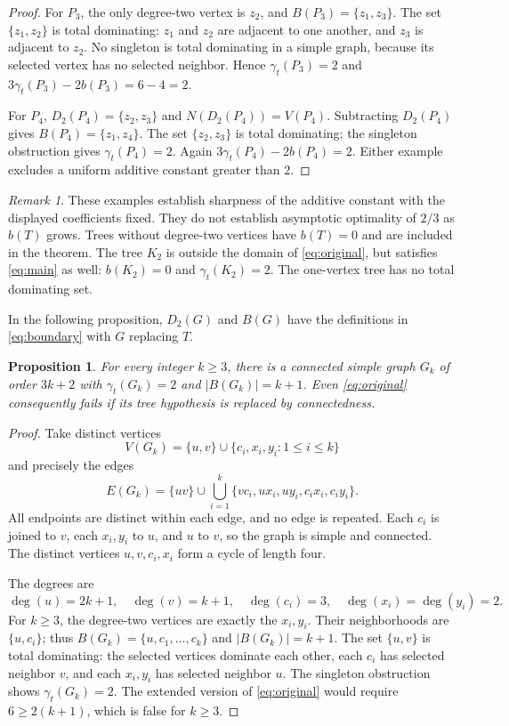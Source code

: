 \documentclass[11pt,a4paper]{article}
\newtheorem{proposition}[theorem]{Proposition}
\theoremstyle{remark}
\newtheorem{remark}[theorem]{Remark}
\newcommand{\td}{\gamma_t}
\newcommand{\BB}{B}
\begin{document}
\begin{proof}
For $P_3$, the only degree-two vertex is $z_2$, and
$\BB(P_3)=\{z_1,z_3\}$. The set $\{z_1,z_2\}$ is total dominating:
$z_1$ and $z_2$ are adjacent to one another, and $z_3$ is adjacent
to $z_2$. No singleton is total dominating in a simple graph,
because its selected vertex has no selected neighbor. Hence
$\td(P_3)=2$ and $3\td(P_3)-2b(P_3)=6-4=2$.

For $P_4$, $D_2(P_4)=\{z_2,z_3\}$ and $N(D_2(P_4))=V(P_4)$.
Subtracting $D_2(P_4)$ gives $\BB(P_4)=\{z_1,z_4\}$.
The set $\{z_2,z_3\}$ is total dominating; the singleton obstruction
gives $\td(P_4)=2$. Again $3\td(P_4)-2b(P_4)=2$.
Either example excludes a uniform additive constant greater than $2$.
\end{proof}

\begin{remark}
These examples establish sharpness of the additive constant with
the displayed coefficients fixed. They do not establish asymptotic
optimality of $2/3$ as $b(T)$ grows. Trees without degree-two vertices
have $b(T)=0$ and are included in the theorem. The tree $K_2$ is
outside the domain of \eqref{eq:original}, but satisfies
\eqref{eq:main} as well: $b(K_2)=0$ and $\td(K_2)=2$.
The one-vertex tree has no total dominating set.
\end{remark}

In the following proposition, $D_2(G)$ and $\BB(G)$ have the
definitions in \eqref{eq:boundary} with $G$ replacing $T$.

\begin{proposition}\label{prop:cycles}
For every integer $k\ge 3$, there is a connected simple graph $G_k$
of order $3k+2$ with $\td(G_k)=2$ and $|\BB(G_k)|=k+1$.
Even \eqref{eq:original} consequently fails if its tree hypothesis
is replaced by connectedness.
\end{proposition}

\begin{proof}
Take distinct vertices
\[
 V(G_k)=\{u,v\}\cup\{c_i,x_i,y_i:1\le i\le k\}
\]
and precisely the edges
\[
 E(G_k)=\{uv\}\cup
 \bigcup_{i=1}^{k}\{vc_i,ux_i,uy_i,c_ix_i,c_iy_i\}.
\]
All endpoints are distinct within each edge, and no edge is repeated.
Each $c_i$ is joined to $v$, each $x_i,y_i$ to $u$, and $u$ to $v$,
so the graph is simple and connected. The distinct vertices
$u,v,c_i,x_i$ form a cycle of length four.

The degrees are
\[
 \deg(u)=2k+1,\quad \deg(v)=k+1,\quad
 \deg(c_i)=3,\quad \deg(x_i)=\deg(y_i)=2.
\]
For $k\ge 3$, the degree-two vertices are exactly the $x_i,y_i$.
Their neighborhoods are $\{u,c_i\}$; thus
$\BB(G_k)=\{u,c_1,\ldots,c_k\}$ and $|\BB(G_k)|=k+1$.
The set $\{u,v\}$ is total dominating: the selected vertices
dominate each other, each $c_i$ has selected neighbor $v$, and
each $x_i,y_i$ has selected neighbor $u$. The singleton obstruction
shows $\td(G_k)=2$. The extended version of \eqref{eq:original}
would require $6\ge 2(k+1)$, which is false for $k\ge 3$.
\end{proof}
\end{document}
